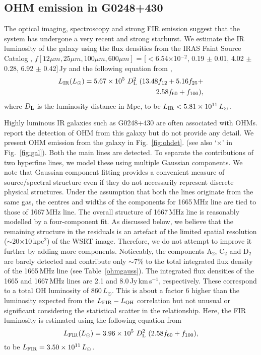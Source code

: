 \documentclass[iop,apjl,numberedappendix,appendixfloats,twocolappendix,revtex4]{emulateapj}
\newcommand{\kms}{km\,s$^{-1}$}
\begin{document}
\subsection{OHM emission in G0248+430}    
\label{sec:ohem}  

The optical imaging, spectroscopy and strong FIR emission suggest that the system has undergone a very recent and strong starburst.  
%
We estimate the IR luminosity of the galaxy using the flux densities from the IRAS Faint Source Catalog \citep[][]{Moshir90}, 
$f[12\mu m, 25\mu m, 100\mu m, 600\mu m]$ = [$<$6.54$\times$10$^{-2}$, 0.19 $\pm$ 0.01, 4.02 $\pm$ 0.28, 6.92 $\pm$ 0.42]\,Jy and
the following equation from \citet{Sanders96}, 
\begin{equation}
\begin{split}
L_{\rm IR} (L_ {\odot})=5.67 \times 10^{5}~D_{\rm L}^{2}~(13.48f_{12} + 5.16f_{25} + \\ 2.58f_{60} + f_{100}),
\end{split}
\end{equation}
where $D_{\rm L}$ is the luminosity distance in Mpc, to be  $L_{\rm IR} < 5.81 \times 10^{11}\,L_ {\odot}$. 

Highly luminous IR galaxies such as G0248+430 are often associated with OHMs.
% 
\citet[][]{Kazes89} report the detection of OHM from this galaxy but do not provide any detail.     
We present OHM emission from the galaxy in  Fig.~\ref{fig:ohdet}. (see also `$\times$' in Fig.~\ref{fig:gal}). 
Both the main lines are detected.  To separate the contributions of two hyperfine lines, 
we model these using multiple Gaussian components. 
We note that Gaussian component fitting provides a convenient measure of source/spectral structure even if they do not necessarily represent discrete physical structures.
 Under the assumption that both the 
lines originate from the same gas, the centres and widths of the components for 1665\,MHz line are tied to those of 1667\,MHz line.  
The overall structure of 1667\,MHz line is reasonably modelled by a four-component fit. As discussed below, we believe 
that the remaining structure in the residuals is an artefact of the limited spatial resolution 
($\sim$20$\times$10\,kpc$^2$) of the WSRT image.  Therefore, we do not attempt to improve it further by adding more components.   
Noticeably, the components A$_2$, C$_2$ and D$_2$ are barely detected and contribute only $\sim$7\% to the total integrated flux density of 
the 1665\,MHz line (see Table~\ref{ohmgauss}). 
The integrated flux densities of the 1665 and 1667\,MHz lines are 2.1 and 8.0\,Jy\,\kms, respectively.  
These correspond to a total OH luminosity of 860\,$L_\odot$. This is about a factor 6 higher than the luminosity 
expected from the $L_{\rm FIR} - L_{\rm OH}$ correlation \citep[cf. equation 4 of][]{Darling02sur} but not unusual 
or significant considering the statistical scatter in the relationship. 
Here, the FIR luminosity is estimated using the following equation from  \citet[][]{Sanders96}
\begin{equation}
L_{\rm FIR} (L_ {\odot}) = 3.96 \times 10^{5}~D_{\rm L}^{2}~(2.58f_{60}+f_{100}),
\end{equation}
to be $L_{\rm FIR} = 3.50 \times 10^{11}\,L_ {\odot}$.
\end{document}
